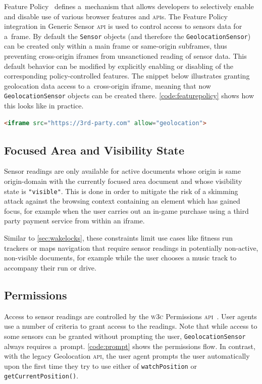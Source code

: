 \documentclass[sigconf,hyphens]{acmart}
\begin{document}
Feature Policy~\cite{clelland2019featurepolicy} defines a~mechanism that allows developers
to selectively enable and disable use of various browser features and \textsc{api}s.
The Feature Policy integration in Generic Sensor \textsc{api}
is used to control access to sensors data for a~frame.
By default the \texttt{Sensor} objects (and therefore the \texttt{GeolocationSensor})
can be created only within a main frame or same-origin subframes,
thus preventing cross-origin iframes from unsanctioned reading of sensor data.
This default behavior can be modified by explicitly enabling or disabling
of the corresponding policy-controlled features.
The snippet below illustrates granting geolocation data access to a~cross-origin iframe,
meaning that now \texttt{GeolocationSensor} objects can be created there.
\autoref{code:featurepolicy} shows how this looks like in practice.

\begin{lstlisting}[caption={Allowing an iframe to use \texttt{GeolocationSensor}},
  label=code:featurepolicy, language=HTML, float=h] 
<iframe src="https://3rd-party.com" allow="geolocation">
\end{lstlisting}

\subsection{Focused Area and Visibility State}
\label{sec:focusandvisibility}

Sensor readings are only available for active documents whose origin is same origin-domain
with the currently focused area document and whose visibility state is \texttt{"visible"}.
This is done in order to mitigate the risk of a skimming attack
against the browsing context containing an element which has gained focus,
for example when the user carries out an in-game purchase using a third party payment service
from within an iframe.

Similar to \autoref{sec:wakelocks}, these constraints limit use cases like fitness run trackers
or maps navigation that require sensor readings in potentially non-active, non-visible documents,
for example while the user chooses a music track to accompany their run or drive.

\subsection{Permissions}

Access to sensor readings are controlled by the \textsc{w3c} Permissions
\textsc{api}~\cite{lamouri2017permissions}.
User agents use a number of criteria to grant access to the readings.
Note that while access to some sensors can be granted without prompting the user,
\texttt{GeolocationSensor} always requires a~prompt.
\autoref{code:prompt} shows the permissions flow.
In contrast, with the legacy Geolocation \textsc{api}, the user agent prompts the user automatically
upon the first time they try to use either of \texttt{watchPosition} or \texttt{getCurrentPosition()}.
\end{document}
